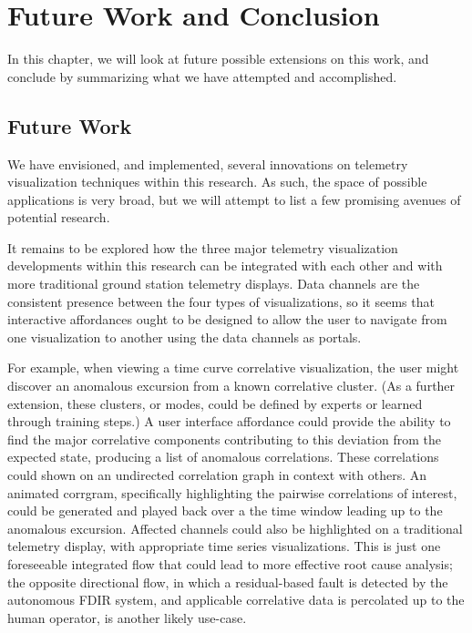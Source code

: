 \chapter{Future Work and Conclusion}

In this chapter, we will look at future possible extensions on this work, and conclude by summarizing what we have attempted and accomplished.

\section{Future Work}

We have envisioned, and implemented, several innovations on telemetry visualization techniques within this research. As such, the space of possible applications is very broad, but we will attempt to list a few promising avenues of potential research.

It remains to be explored how the three major telemetry visualization developments within this research can be integrated with each other and with more traditional ground station telemetry displays. Data channels are the consistent presence between the four types of visualizations, so it seems that interactive affordances ought to be designed to allow the user to navigate from one visualization to another using the data channels as portals.

For example, when viewing a time curve correlative visualization, the user might discover an anomalous excursion from a known correlative cluster. (As a further extension, these clusters, or modes, could be defined by experts or learned through training steps.) A user interface affordance could provide the ability to find the major correlative components contributing to this deviation from the expected state, producing a list of anomalous correlations. These correlations could shown on an undirected correlation graph in context with others. An animated corrgram, specifically highlighting the pairwise correlations of interest, could be generated and played back over a the time window leading up to the anomalous excursion. Affected channels could also be highlighted on a traditional telemetry display, with appropriate time series visualizations. This is just one foreseeable integrated flow that could lead to more effective root cause analysis; the opposite directional flow, in which a residual-based fault is detected by the autonomous FDIR system, and applicable correlative data is percolated up to the human operator, is another likely use-case.

